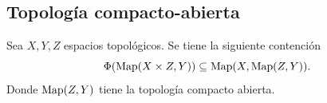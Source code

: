 \subsection{Topología compacto-abierta}
\begin{definicion}
    
\end{definicion}
\begin{prop}
    Sea $X,Y,Z$ espacios topológicos. Se tiene la siguiente contención 
    \begin{equation*}
        \Phi(\mathrm{Map}(X\times Z,Y))\subseteq \mathrm{Map}(X,\mathrm{Map}(Z,Y)).
    \end{equation*}
    Donde $\mathrm{Map}(Z,Y)$ tiene la topología compacto abierta.
\end{prop}
